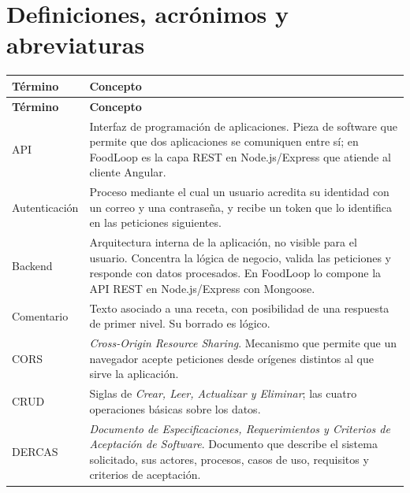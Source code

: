 \documentclass[doc,12pt,a4paper]{apa7}
\begin{document}
\newpage

{\linespread{0.96}\selectfont\tableofcontents}
\newpage

\section{Definiciones, acrónimos y abreviaturas}

\begin{longtable}{|P{3.3cm}|L{11.2cm}|}
\hline
\textbf{Término} & \textbf{Concepto} \\ \hline
\endfirsthead
\hline
\textbf{Término} & \textbf{Concepto} \\ \hline
\endhead
\hline
\endfoot

API & Interfaz de programación de aplicaciones. Pieza de software que permite que dos aplicaciones se comuniquen entre sí; en FoodLoop es la capa REST en Node.js/Express que atiende al cliente Angular. \\ \hline

Autenticación & Proceso mediante el cual un usuario acredita su identidad con un correo y una contraseña, y recibe un token que lo identifica en las peticiones siguientes. \\ \hline

Backend & Arquitectura interna de la aplicación, no visible para el usuario. Concentra la lógica de negocio, valida las peticiones y responde con datos procesados. En FoodLoop lo compone la API REST en Node.js/Express con Mongoose. \\ \hline

Comentario & Texto asociado a una receta, con posibilidad de una respuesta de primer nivel. Su borrado es lógico. \\ \hline

CORS & \textit{Cross-Origin Resource Sharing}. Mecanismo que permite que un navegador acepte peticiones desde orígenes distintos al que sirve la aplicación. \\ \hline

CRUD & Siglas de \textit{Crear, Leer, Actualizar y Eliminar}; las cuatro operaciones básicas sobre los datos. \\ \hline

DERCAS & \textit{Documento de Especificaciones, Requerimientos y Criterios de Aceptación de Software}. Documento que describe el sistema solicitado, sus actores, procesos, casos de uso, requisitos y criterios de aceptación. \\ \hline


\end{longtable}
\end{document}
